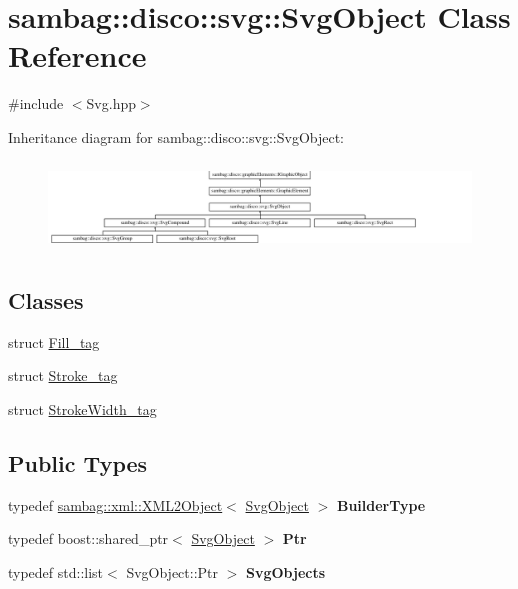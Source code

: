 \hypertarget{classsambag_1_1disco_1_1svg_1_1_svg_object}{
\section{sambag::disco::svg::SvgObject Class Reference}
\label{classsambag_1_1disco_1_1svg_1_1_svg_object}
}


{\ttfamily \#include $<$Svg.hpp$>$}

Inheritance diagram for sambag::disco::svg::SvgObject:\begin{figure}[H]
\begin{center}
\leavevmode
\includegraphics[height=2.389079cm]{classsambag_1_1disco_1_1svg_1_1_svg_object}
\end{center}
\end{figure}
\subsection*{Classes}
\begin{DoxyCompactItemize}
\item 
struct \hyperlink{structsambag_1_1disco_1_1svg_1_1_svg_object_1_1_fill__tag}{Fill\_\-tag}
\item 
struct \hyperlink{structsambag_1_1disco_1_1svg_1_1_svg_object_1_1_stroke__tag}{Stroke\_\-tag}
\item 
struct \hyperlink{structsambag_1_1disco_1_1svg_1_1_svg_object_1_1_stroke_width__tag}{StrokeWidth\_\-tag}
\end{DoxyCompactItemize}
\subsection*{Public Types}
\begin{DoxyCompactItemize}
\item 
\hypertarget{classsambag_1_1disco_1_1svg_1_1_svg_object_a658b68f468a3d69bc714d67af800fdaf}{
typedef \hyperlink{classsambag_1_1xml_1_1_x_m_l2_object}{sambag::xml::XML2Object}$<$ \hyperlink{classsambag_1_1disco_1_1svg_1_1_svg_object}{SvgObject} $>$ {\bfseries BuilderType}}
\label{classsambag_1_1disco_1_1svg_1_1_svg_object_a658b68f468a3d69bc714d67af800fdaf}

\item 
\hypertarget{classsambag_1_1disco_1_1svg_1_1_svg_object_aff27d18dd0c94f46600edf6ace085ed9}{
typedef boost::shared\_\-ptr$<$ \hyperlink{classsambag_1_1disco_1_1svg_1_1_svg_object}{SvgObject} $>$ {\bfseries Ptr}}
\label{classsambag_1_1disco_1_1svg_1_1_svg_object_aff27d18dd0c94f46600edf6ace085ed9}

\item 
\hypertarget{classsambag_1_1disco_1_1svg_1_1_svg_object_a5f38522de0c74a49514e6fba84e9fcb1}{
typedef std::list$<$ SvgObject::Ptr $>$ {\bfseries SvgObjects}}
\label{classsambag_1_1disco_1_1svg_1_1_svg_object_a5f38522de0c74a49514e6fba84e9fcb1}

\end{DoxyCompactItemize}

